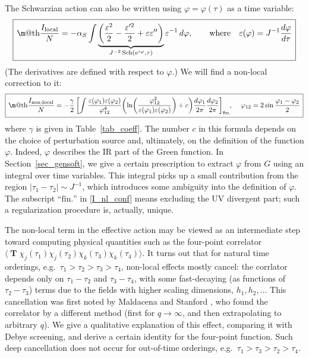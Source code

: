 \documentclass[12pt]{article}
\makeatletter
\newcommand*{\wideboxed}[1]{\setlength{\fboxsep}{1ex}%
  \fbox{\m@th$\displaystyle#1$}}
\newcommand*{\corr}[1]{\langle{#1}\rangle}
\DeclareMathOperator{\Sch}{Sch}
\DeclareMathOperator{\TT}{\mathbf{T}}
\newcommand{\loc}{\text{local}}
\newcommand{\nloc}{\text{non-local}}
\newcommand{\vep}{\varepsilon}
\newcommand{\vp}{\varphi}
\def\eg{e.g.\ }
\makeatother
\begin{document}
The Schwarzian action can also be written using $\vp=\vp(\tau)$ as a time variable:
\begin{equation} \label{I_loc_conf}
\wideboxed{
\frac{I_{\loc}}{N}=-\alpha_S\int
\underbrace{\left(\frac{\vep^2}{2}-\frac{\vep'^2}{2}+\vep\vep''\right)}
_{J^{-2}\Sch(e^{i\vp},\tau)}\vep^{-1}\,d\vp,\qquad
\text{where}\quad
\vep(\vp)=J^{-1}\frac{d\vp}{d\tau}
}
\end{equation}
(The derivatives are defined with respect to $\vp$.) We will find a non-local correction to it:
\begin{equation} \label{I_nl_conf}
\wideboxed{
\frac{I_{\nloc}}{N}=-\frac{\gamma}{2}
\left[\int\frac{\vep(\vp_1)\vep(\vp_2)}{\vp_{12}^4}
\biggl(\ln\biggl(\frac{\vp_{12}^2}{\vep(\vp_1)\vep(\vp_2)}\biggr)
+c\biggr)\frac{d\vp_1}{2\pi}\frac{d\vp_2}{2\pi}\right]_{\text{fin.}}\!\!,
\quad\, \vp_{12}=2\sin\frac{\vp_1-\vp_2}{2}
}
\end{equation}
where $\gamma$ is given in Table~\ref{tab_coeff}. The number $c$ in this formula depends on the choice of perturbation source and, ultimately, on the definition of the function $\vp$. Indeed, $\vp$ describes the IR part of the Green function. In Section~\ref{sec_gensoft}, we give a certain prescription to extract $\vp$ from $G$ using an integral over time variables. This integral picks up a small contribution from the region $|\tau_1-\tau_2|\sim J^{-1}$, which introduces some ambiguity into the definition of $\vp$. The subscript ``$\text{fin.}$'' in \eqref{I_nl_conf} means excluding the UV divergent part; such a regularization procedure is, actually, unique.

The non-local term in the effective action may be viewed as an intermediate step toward computing physical quantities such as the four-point correlator $\corr{\TT\chi_j(\tau_1)\chi_j(\tau_2)\chi_k(\tau_3)\chi_k(\tau_4)}$. It turns out that for natural time orderings, \eg $\tau_1>\tau_2>\tau_3>\tau_4$, non-local effects mostly cancel: the corrlator depends only on $\tau_1-\tau_2$ and $\tau_3-\tau_4$, with some fast-decaying (as functions of $\tau_2-\tau_3$) terms due to the fields with higher scaling dimensions, $h_1,h_2,\ldots$ This cancellation was first noted by Maldacena and Stanford \cite{MS16}, who found the correlator by a different method (first for $q\to\infty$, and then extrapolating to arbitrary $q$). We give a qualitative explanation of this effect, comparing it with Debye screening, and derive a certain identity for the four-point function. Such deep cancellation does not occur for out-of-time orderings, \eg $\tau_1>\tau_3>\tau_2>\tau_4$.
\end{document}
